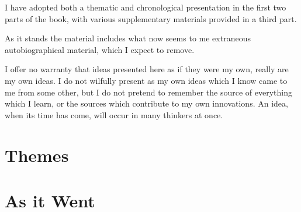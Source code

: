 I have adopted both a thematic and chronological presentation in the first two parts of the book, with various supplementary materials provided in a third part.

As it stands the material includes what now seems to me extraneous autobiographical material, which I expect to remove.

I offer no warranty that ideas presented here as if they were my own, really are my own ideas.
I do not wilfully present as my own ideas which I know came to me from some other, but I do not pretend to remember the source of everything which I learn, or the sources which contribute to my own innovations.
An idea, when its time has come, will occur in many thinkers at once.

\part{Themes}



\part{As it Went}



\appendix





\backmatter




\label{index}
\twocolumn[]
{\small\printindex}

